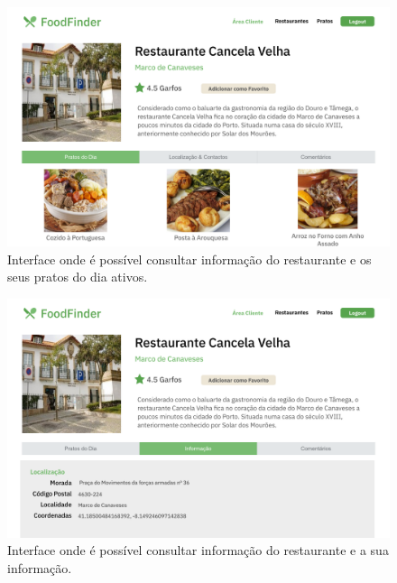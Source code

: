 \documentclass[a4paper,12pt]{report}
\begin{document}
	\begin{figure}[H]
	\begin{center}
	\includegraphics[scale=0.25]{8.1-Screen5}	
	\end{center}
	\caption{Interface onde é possível consultar informação do restaurante e os seus pratos do dia ativos.}
	\end{figure} 
	
	\begin{figure}[H]
	\begin{center}
	\includegraphics[scale=0.25]{9.1-Screen6}	
	\end{center}
	\caption{Interface onde é possível consultar informação do restaurante e a sua informação.}
	\end{figure} 
	
\end{document}
